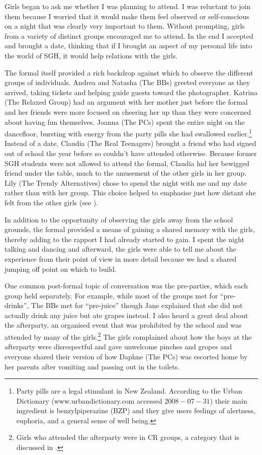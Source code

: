 Girls began to ask me whether I was planning to attend. I was reluctant to join them because I worried that it would make them feel observed or self-conscious on a night that was clearly very important to them. Without prompting, girls from a variety of distinct groups encouraged me to attend. In the end I accepted and brought a date, thinking that if I brought an aspect of my personal life into the world of SGH, it would help relations with the girls. 

The formal itself provided a rich backdrop against which to observe the different groups of individuals. Andrea and Natasha (The BBs) greeted everyone as they arrived, taking tickets and helping guide guests toward the photographer. Katrina (The Relaxed Group) had an argument with her mother just before the formal and her friends were more focused on cheering her up than they were concerned about having fun themselves. Joanna (The PCs) spent the entire night on the dancefloor, bursting with energy from the party pills she had swallowed earlier.\footnote{Party pills are a legal stimulant in New Zealand. According to the Urban Dictionary (www.urbandictionary.com accessed $2008-07-31$) their main ingredient is benzylpiperazine (BZP) and they give users feelings of alertness, euphoria, and a general sense of well being.}  Instead of a date, Claudia (The Real Teenagers) brought a friend who had signed out of school the year before so couldn't have attended otherwise. Because former SGH students were not allowed to attend the formal, Claudia hid her bewigged friend under the table, much to the amusement of the other girls in her group. Lily (The Trendy Alternatives) chose to spend the night with me and my date rather than with her group. This choice helped to emphasise just how distant she felt from the other girls (see ). 
\nocite{urbandict}

\largerpage
In addition to the opportunity of observing the girls away from the school grounds, the formal provided a means of gaining a shared memory with the girls, thereby adding to the rapport I had already started to gain. I spent the night talking and dancing and afterward, the girls were able to tell me about the experience from their point of view in more detail because we had a shared jumping off point on which to build. 

One common post-formal topic of conversation was the pre-parties, which each group held separately. For example, while most of the groups met for ``pre-drinks'', The BBs met for ``pre-juice'' though Jane explained that she did not actually drink any juice but ate grapes instead. I also heard a great deal about the afterparty, an organised event that was prohibited by the school and was attended by many of the girls.\footnote{Girls who attended the afterparty were in CR groups, a category that is discussed in .}  The girls complained about how the boys at the afterparty  were disrespectful and gave unwelcome pinches and gropes and everyone shared their version of how Daphne (The PCs) was escorted home by her parents after vomiting and passing out in the toilets.

